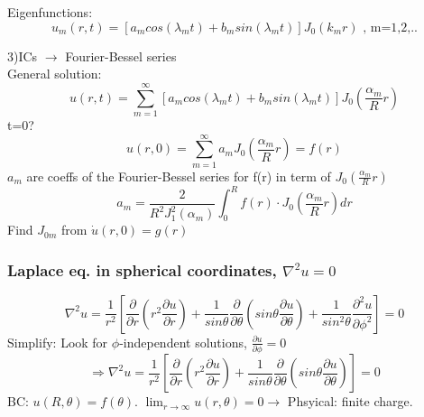 \documentclass[10pt,a4paper]{article}
\begin{document}
\begin{multicols}{2}
Eigenfunctions: 
\[u_{m}(r,t)=\left[a_{m}cos(\lambda_{m}t)+b_{m}sin(\lambda_{m}t)\right]J_{0}(k_{m}r) \text{  , m=1,2,..}\] 

3)ICs $\rightarrow$ Fourier-Bessel series \\
General solution: 
\[u(r,t) = \sum_{m=1}^{\infty}\left[ a_{m}cos(\lambda_{m}t)+b_{m}sin(\lambda_{m}t)\right]J_{0}\left(\frac{\alpha_{m}}{R}r\right)\]
t=0? \[u(r,0)=\sum_{m=1}^{\infty}a_{m}J_{0}\left(\frac{\alpha_{m}}{R}r\right)=f(r)\]
$a_{m}$ are coeffs of the Fourier-Bessel series for f(r) in term of $J_{0}\left(\frac{\alpha_{m}}{R}r\right)$
\[a_{m}=\frac{2}{R^{2}J_{1}^{2}\left(\alpha_{m}\right)}\int_{0}^{R}f(r)\cdot J_{0}\left(\frac{\alpha_{m}}{R}r\right)dr\]
Find $J_{0m}$ from $\dot u(r,0)=g(r)$

\subsubsection*{Laplace eq. in spherical coordinates, \texorpdfstring{$\nabla^{2}u=0$}{}}
\[\nabla^{2}u=\frac{1}{r^{2}}\left[\frac{\partial}{\partial r}\left(r^{2}\frac{\partial u}{\partial r}\right)+\frac{1}{sin\theta}\frac{\partial}{\partial \theta}\left(sin\theta\frac{\partial u}{\partial \theta}\right)+\frac{1}{sin^{2}\theta}\frac{\partial^{2}u}{\partial \phi^{2}}\right]=0\]
Simplify: Look for $\phi$-independent solutions, $\frac{\partial u}{\partial \phi}=0$
\[\Rightarrow \nabla^{2}u=\frac{1}{r^{2}}\left[\frac{\partial}{\partial r}\left(r^{2}\frac{\partial u}{\partial r}\right)+\frac{1}{sin\theta}\frac{\partial}{\partial \theta}\left(sin\theta\frac{\partial u}{\partial \theta}\right)\right]=0\]
BC: $u(R,\theta)=f(\theta)$. \(\lim_{r\to \infty}u(r,\theta)=0 \rightarrow\) Phsyical: finite charge. 


\end{multicols}
\end{document}
